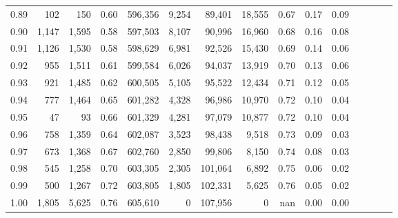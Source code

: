 \begin{tabular}{rrrcrrrrrrrrrrr}
0.89 &     102 &    150 &                                       0.60 &  596,356 &    9,254 &   89,401 &   18,555 &  0.67 &  0.17 &                         0.09 \\
0.90 &   1,147 &  1,595 &                                       0.58 &  597,503 &    8,107 &   90,996 &   16,960 &  0.68 &  0.16 &                         0.08 \\
0.91 &   1,126 &  1,530 &                                       0.58 &  598,629 &    6,981 &   92,526 &   15,430 &  0.69 &  0.14 &                         0.06 \\
0.92 &     955 &  1,511 &                                       0.61 &  599,584 &    6,026 &   94,037 &   13,919 &  0.70 &  0.13 &                         0.06 \\
0.93 &     921 &  1,485 &                                       0.62 &  600,505 &    5,105 &   95,522 &   12,434 &  0.71 &  0.12 &                         0.05 \\
0.94 &     777 &  1,464 &                                       0.65 &  601,282 &    4,328 &   96,986 &   10,970 &  0.72 &  0.10 &                         0.04 \\
0.95 &      47 &     93 &                                       0.66 &  601,329 &    4,281 &   97,079 &   10,877 &  0.72 &  0.10 &                         0.04 \\
0.96 &     758 &  1,359 &                                       0.64 &  602,087 &    3,523 &   98,438 &    9,518 &  0.73 &  0.09 &                         0.03 \\
0.97 &     673 &  1,368 &                                       0.67 &  602,760 &    2,850 &   99,806 &    8,150 &  0.74 &  0.08 &                         0.03 \\
0.98 &     545 &  1,258 &                                       0.70 &  603,305 &    2,305 &  101,064 &    6,892 &  0.75 &  0.06 &                         0.02 \\
0.99 &     500 &  1,267 &                                       0.72 &  603,805 &    1,805 &  102,331 &    5,625 &  0.76 &  0.05 &                         0.02 \\
1.00 &   1,805 &  5,625 &                                       0.76 &  605,610 &        0 &  107,956 &        0 &   nan &  0.00 &                         0.00 \\
\bottomrule
\end{tabular}
